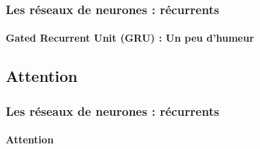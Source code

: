 \documentclass[xcolor=table]{beamer}
\begin{document}
\begin{frame}
	\frametitle{Les réseaux de neurones : récurrents}
	\framesubtitle{Gated Recurrent Unit (GRU) : Un peu d'humeur}
	
	\begin{center}
	\end{center}
	
\end{frame}


\subsection{Attention}

\begin{frame}
	\frametitle{Les réseaux de neurones : récurrents}
	\framesubtitle{Attention}
	
	
	
\end{frame}

\end{document}
